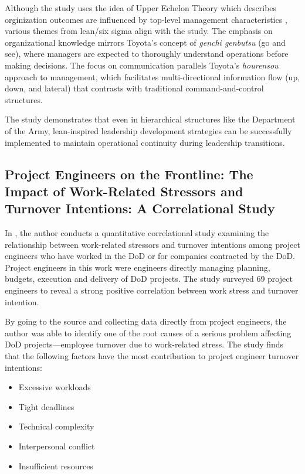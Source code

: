 \documentclass{article}
\begin{document}
		Although the study uses the idea of Upper Echelon Theory which describes orginization outcomes are influenced by top-level management characteristics \cite{uppere}, various themes from lean/six sigma align with the study.
		The emphasis on organizational knowledge mirrors Toyota's concept of \textit{genchi genbutsu} (go and see), where managers are expected to thoroughly understand operations before making decisions. 
		The focus on communication parallels Toyota's \textit{hourensou} approach to management, which facilitates multi-directional information flow (up, down, and lateral) that contrasts with traditional command-and-control structures.

		The study demonstrates that even in hierarchical structures like the Department of the Army, lean-inspired leadership development strategies can be successfully implemented to maintain operational continuity during leadership transitions.


	\subsection{Project Engineers on the Frontline: The Impact of Work-Related Stressors and Turnover Intentions: A Correlational Study \cite{Turner2024}}

		In \cite{Turner2024}, the author conducts a quantitative correlational study examining the relationship between work-related stressors and turnover intentions among project engineers who have worked in the DoD or for companies contracted by the DoD. 
		Project engineers in this work were engineers directly managing planning, budgets, execution and delivery of DoD projects.
		The study surveyed 69 project engineers to reveal a strong positive correlation between work stress and turnover intention.

		By going to the source and collecting data directly from project engineers, the author was able to identify one of the root causes of a serious problem affecting DoD projects—employee turnover due to work-related stress. 
		The study finds that the following factors have the most contribution to project engineer turnover intentions:

		\begin{itemize}
			\item Excessive workloads
			\item Tight deadlines
			\item Technical complexity
			\item Interpersonal conflict
			\item Insufficient resources
		\end{itemize}
\end{document}
